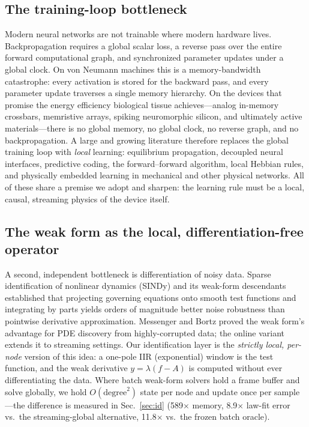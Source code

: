 \documentclass[11pt]{article}
\begin{document}
\subsection{The training-loop bottleneck}
Modern neural networks are not trainable where modern hardware lives.
Backpropagation\cite{BP86} requires a global scalar loss, a reverse pass over the entire
forward computational graph, and synchronized parameter updates under a global clock.
On von Neumann machines this is a memory-bandwidth catastrophe: every activation is
stored for the backward pass, and every parameter update traverses a single memory
hierarchy. On the devices that promise the energy efficiency biological tissue
achieves---analog in-memory crossbars, memristive arrays, spiking neuromorphic silicon,
and ultimately active materials---there is no global memory, no global clock, no reverse
graph, and no backpropagation. A large and growing literature therefore replaces the
global training loop with \emph{local} learning: equilibrium
propagation\cite{EP17}, decoupled neural interfaces\cite{DNI17}, predictive
coding\cite{RB99}, the forward--forward algorithm\cite{FF22}, local Hebbian
rules\cite{KH19}, and physically embedded learning in mechanical\cite{Stern21,MN24} and
other physical networks. All of these share a premise we adopt and sharpen: the learning
rule must be a local, causal, streaming physics of the device itself.

\subsection{The weak form as the local, differentiation-free operator}
A second, independent bottleneck is differentiation of noisy data. Sparse identification
of nonlinear dynamics (SINDy)\cite{SINDy16} and its weak-form
descendants\cite{WSINDy21,OWSINDy22} established that projecting governing equations
onto smooth test functions and integrating by parts yields orders of magnitude better
noise robustness than pointwise derivative approximation. Messenger and
Bortz\cite{WSINDy21} proved the weak form's advantage for PDE discovery from
highly-corrupted data; the online variant\cite{OWSINDy22} extends it to streaming
settings. Our identification layer is the \emph{strictly local, per-node} version of
this idea: a one-pole IIR (exponential) window is the test function, and the weak
derivative $y = \lambda(f - A)$ is computed without ever differentiating the data.
Where batch weak-form solvers hold a frame buffer and solve globally, we hold
$O(\mathrm{degree}^2)$ state per node and update once per sample---the difference is
measured in Sec.~\ref{sec:id} (589$\times$ memory, 8.9$\times$ law-fit error vs.\ the
streaming-global alternative, 11.8$\times$ vs.\ the frozen batch oracle).
\end{document}
